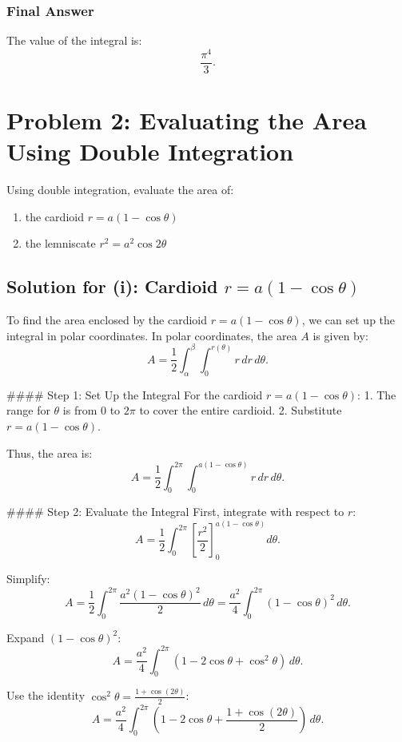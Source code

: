 \documentclass{article}
\begin{document}
\subsubsection*{Final Answer}
The value of the integral is:
\[
\boxed{\frac{\pi^4}{3}}.
\]


\section*{Problem 2: Evaluating the Area Using Double Integration}
Using double integration, evaluate the area of:
\begin{enumerate}
    \item the cardioid \( r = a(1 - \cos \theta) \)
    \item the lemniscate \( r^2 = a^2 \cos 2\theta \)
\end{enumerate}

\subsection*{Solution for (i): Cardioid \( r = a(1 - \cos \theta) \)}
To find the area enclosed by the cardioid \( r = a(1 - \cos \theta) \), we can set up the integral in polar coordinates. In polar coordinates, the area \( A \) is given by:
\[
A = \frac{1}{2} \int_{\alpha}^{\beta} \int_0^{r(\theta)} r \, dr \, d\theta.
\]

#### Step 1: Set Up the Integral
For the cardioid \( r = a(1 - \cos \theta) \):
1. The range for \( \theta \) is from \( 0 \) to \( 2\pi \) to cover the entire cardioid.
2. Substitute \( r = a(1 - \cos \theta) \).

Thus, the area is:
\[
A = \frac{1}{2} \int_0^{2\pi} \int_0^{a(1 - \cos \theta)} r \, dr \, d\theta.
\]

#### Step 2: Evaluate the Integral
First, integrate with respect to \( r \):
\[
A = \frac{1}{2} \int_0^{2\pi} \left[ \frac{r^2}{2} \right]_0^{a(1 - \cos \theta)} d\theta.
\]

Simplify:
\[
A = \frac{1}{2} \int_0^{2\pi} \frac{a^2(1 - \cos \theta)^2}{2} \, d\theta = \frac{a^2}{4} \int_0^{2\pi} (1 - \cos \theta)^2 \, d\theta.
\]

Expand \( (1 - \cos \theta)^2 \):
\[
A = \frac{a^2}{4} \int_0^{2\pi} (1 - 2\cos \theta + \cos^2 \theta) \, d\theta.
\]

Use the identity \( \cos^2 \theta = \frac{1 + \cos(2\theta)}{2} \):
\[
A = \frac{a^2}{4} \int_0^{2\pi} \left( 1 - 2\cos \theta + \frac{1 + \cos(2\theta)}{2} \right) \, d\theta.
\]
\end{document}
